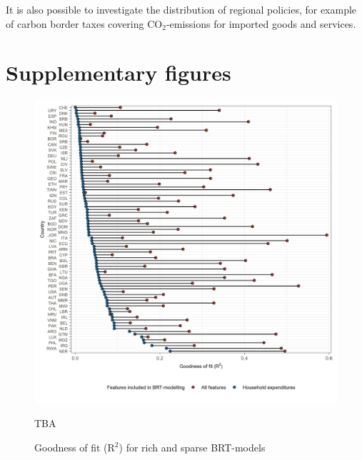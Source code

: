 \documentclass[12pt, a4paper]{article}
\newenvironment{subcaption2}
{\strut
\vspace{-5pt}
\begin{minipage}[b]{0.9\textwidth}
  \hspace*{-\parindent}
  \footnotesize}
 {\end{minipage}}
\begin{document}
It is also possible to investigate the distribution of regional policies, for example of carbon border taxes covering CO$_{2}$-emissions for imported goods and services. 

\clearpage

\renewcommand\thefigure{\thesection.\arabic{figure}}
\renewcommand\thetable{\thesection.\arabic{table}}
\setcounter{figure}{0}
\setcounter{table}{0}

\section{Supplementary figures} \label{sec:figures}


\clearpage


\clearpage


\clearpage


\clearpage


\clearpage

\begin{figure}[ht!]
    \centering
    \caption{Goodness of fit (R$^{2}$) for rich and sparse BRT-models}
    \includegraphics[width=\textwidth]{1_Figures/Figures_Appendix/Figure_Comparison_Models.jpg}
    \label{fig:comparison_models}
    \begin{subcaption2}
    TBA
    \end{subcaption2}
\end{figure}
\end{document}
